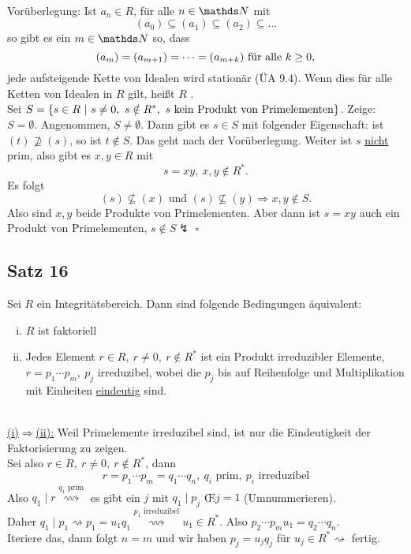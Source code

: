 \\
Vorüberlegung: Ist $a_n\in R$, für alle $n\in \N$ mit
\[
(a_0)\subseteq (a_1)\subseteq (a_2)\subseteq...
\]
so gibt es ein $m\in \N$ so, dass
\[
(a_m)=(a_{m+1})= \dots =(a_{m+k})\text{ für alle }k\ge 0,
\]
jede aufsteigende Kette von Idealen wird stationär (ÜA 9.4).
Wenn dies für alle Ketten von Idealen in $R$ gilt, heißt $R$ .\\
Sei $S=\left\{s\in R~|~s\neq 0,~s\notin R^*,~s\text{ kein Produkt von Primelementen}\right\}$.
Zeige: $S=\emptyset$.
Angenommen, $S\neq \emptyset$.
Dann gibt es $s\in S$ mit folgender Eigenschaft: ist $(t)\nsupseteq (s)$, so ist $t\notin S$.
Das geht nach der Vorüberlegung.
Weiter ist $s$ \uline{nicht} prim, also gibt es $x,y\in R$ mit
\[
s=xy,~x,y\notin R^*.
\]
Es folgt
\[
(s)\nsubseteq (x) \text{ und } (s)\nsubseteq (y)\Rightarrow x,y\notin S.
\]
Also sind $x,y$ beide Produkte von Primelementen.
Aber dann ist $s=xy$ auch ein Produkt von Primelementen, $s\notin S \lightning$
\hfill $\square$

\subsection{Satz 16}
\label{sub:satz_16}
Sei $R$ ein Integritätsbereich.
Dann sind folgende Bedingungen äquivalent:
\begin{enumerate}[(i)]
	\item $R$ ist faktoriell
	\item Jedes Element $r\in R,~r\neq 0,~r\notin R^*$ ist ein Produkt irreduzibler Elemente, $r=p_1\cdots p_m,~p_j$ irreduzibel, wobei die $p_j$ bis auf Reihenfolge und Multiplikation mit Einheiten \uline{eindeutig} sind.
\end{enumerate}

\\
\uline{(i)$\Rightarrow$(ii):}
Weil Primelemente irreduzibel sind, ist nur die Eindeutigkeit der Faktorisierung zu zeigen.\\
Sei also $r\in R,~r\neq 0,~r\notin R^*$, dann
\[
r=p_1\cdots p_m=q_1\cdots q_n,~ q_i \text{ prim},~p_i\text{ irreduzibel}
\]
Also $q_1\mid r \stackrel{q_1\text{ prim}}{\rightsquigarrow}$ es gibt ein $j$ mit $q_1\mid p_j$ \OE $j=1$ (Umnummerieren).\\
Daher $q_1\mid p_1\rightsquigarrow p_1=u_1q_1\stackrel{p_1\text{ irreduzibel}}{\rightsquigarrow} u_1\in R^*$.
Also $p_2\cdots p_m u_1=q_2\cdots q_n$.\\
Iteriere das, dann folgt $n=m$ und wir haben $p_j=u_jq_j$ für $u_j\in R^*\rightsquigarrow$ fertig.\\

